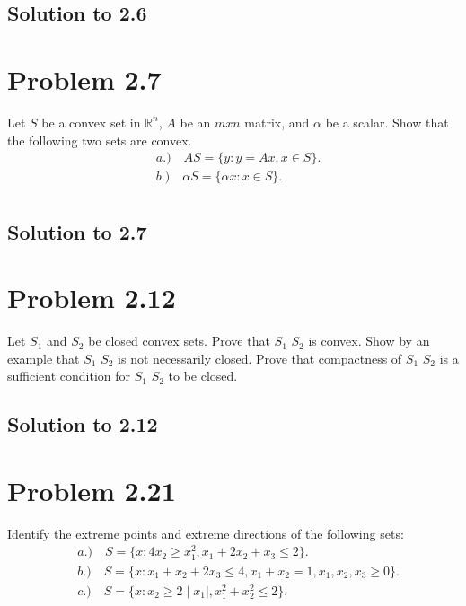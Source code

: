 \documentclass[12pt]{article}
\begin{document}
\subsection{Solution to 2.6}
        
\section{Problem 2.7}
Let $S$ be a convex set in $\mathbb{R}^n$, $A$ be an $m x n$ matrix, and $\alpha$ be a scalar. Show that the following two sets are convex.\\
    \begin{align*}
            &a.) \quad AS = \{ y: y = Ax, x\in {S}\}.\\
            &b.) \quad \alpha S = \{ \alpha x: x \in {S} \}.\\
    \end{align*}
\subsection{Solution to 2.7}

\section{Problem 2.12}
Let $S_1$ and $S_2$ be closed convex sets. Prove that $S_1$ \oplus $S_2$ is convex. Show by an example that $S_1$ \oplus $S_2$ is not necessarily closed. Prove that compactness of $S_1$ \oplus $S_2$ is a sufficient condition for $S_1$ \oplus $S_2$ to be closed.\\ 
\subsection{Solution to 2.12}

\section{Problem 2.21}
Identify the extreme points and extreme directions of the following sets:\\
    \begin{align*}
        &a.) \quad S = \{ x: 4x_2 \geq x_1^2, x_1 + 2x_2 + x_3 \leq 2\}.\\
        &b.) \quad S = \{ x: x_1 + x_2 + 2x_3 \leq 4, x_1 + x_2 = 1, x_1, x_2, x_3 \geq 0 \}.\\
        &c.) \quad S = \{ x: x_2 \ge 2\mid x_1 \mid , x_1^2 + x_2^2 \leq 2 \}.\\
    \end{align*} 
\end{document}
